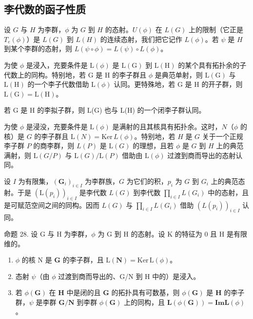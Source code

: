 \subsection{李代数的函子性质}

设 \(G\) 与 \(H\) 为李群，\(\phi\) 为 \(G\) 到 \(H\) 的态射。\(U(\phi)\) 在 \(L(G)\) 上的限制（它正是 \(T_e(\phi)\)）是 \(L(G)\) 到 \(L(H)\) 的连续态射，我们把它记作 \(L(\phi)\)。若 \(\psi\) 是 \(H\) 到某个李群的态射，则 \(L(\psi \circ \phi) = L(\psi) \circ L(\phi)\)。

为使 \(\phi\) 是浸入，充要条件是 \(\mathrm{L}(\phi)\) 是 \(\mathrm{L}(\mathrm{G})\) 到 \(\mathrm{L}(\mathrm{H})\) 的某个具有拓扑余的子代数上的同构。特别地，若 \(\mathrm{G}\) 是 \(\mathrm{H}\) 的李子群且 \(\phi\) 是典范单射，则 \(\mathrm{L}(\mathrm{G})\) 与 \(\mathrm{L}(\mathrm{H})\) 的一个李子代数借助 \(\mathrm{L}(\phi)\) 认同。更特殊地，若 \(\mathrm{G}\) 是 \(\mathrm{H}\) 的开子群，则 \(\mathrm{L}(\mathrm{G}) = \mathrm{L}(\mathrm{H})\)。

若 G 是 H 的李拟子群，则 L(G) 也与 L(H) 的一个闭李子群认同。

为使 \(\phi\) 是浸没，充要条件是 \(\mathrm{L}(\phi)\) 是满射的且其核具有拓扑余。这时，\(N\)（\(\phi\) 的核）是 \(G\) 的李子群且 \(\mathrm{L}(N) = \mathrm{Ker} \, L(\phi)\)。特别地，若 \(H\) 是 \(G\) 关于一个正规李子群 \(P\) 的商李群，则 \(L(P)\) 是 \(\mathrm{L}(G)\) 的理想，且若 \(\phi\) 是 \(G\) 到 \(H\) 上的典范满射，则 \(\mathrm{L}(G/P)\) 与 \(\mathrm{L}(G)/\mathrm{L}(P)\) 借助由 \(\mathrm{L}(\phi)\) 过渡到商而导出的态射认同。

设 \(I\) 为有限集，\((\mathbf{G}_{i})_{i\in I}\) 为李群族，\(G\) 为它们的积，\(p_i\) 为 \(G\) 到 \(G_i\) 上的典范态射。于是 \((\mathrm{L}(p_i))_{i\in I}\) 是李代数 \(L(G)\) 到李代数 \(\prod_{i\in I} L(G_i)\) 中的态射，且是可赋范空间之间的同构。因而 \(L(G)\) 与 \(\prod_{i\in I} L(G_i)\) 借助 \((L(p_i))_{i\in I}\) 认同。

命题 28. 设 G 与 H 为李群，\(\phi\) 为 G 到 H 的态射。设 K 的特征为 0 且 H 是有限维的。

\begin{enumerate}
\def\labelenumi{(\roman{enumi})}
\item
  \(\phi\) 的核 N 是 \(\mathbf{G}\) 的李子群，且 \(\mathrm{L}(\mathbf{N}) = \mathrm{Ker} \, \mathrm{L}(\phi)\)。
\item
  态射 \(\psi\)（由 \(\phi\) 过渡到商而导出的、G/N 到 H 中的）是浸入。
\item
  若 \(\phi(\mathbf{G})\) 在 \(\mathbf{H}\) 中是闭的且 \(\mathbf{G}\) 的拓扑具有可数基，则 \(\phi(\mathbf{G})\) 是 \(\mathbf{H}\) 的李子群，\(\psi\) 是李群 \(\mathbf{G}/\mathbf{N}\) 到李群 \(\phi(\mathbf{G})\) 上的同构，且 \(\mathbf{L}(\phi(\mathbf{G})) = \mathbf{Im} \mathbf{L}(\phi)\)。
\end{enumerate}

